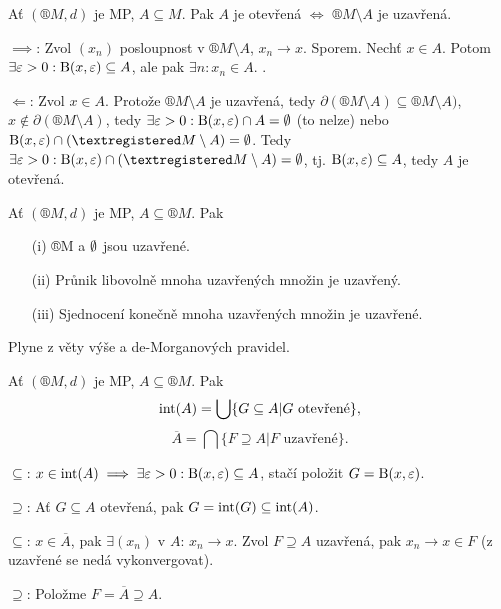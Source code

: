 \documentclass[12pt]{article}					%
\begin{document}
    \begin{veta}
        Ať $(®M, d)$ je MP, $A \subseteq M$. Pak $A$ je otevřená $\Leftrightarrow$ $®M \setminus A$ je uzavřená.

        \begin{dukazin}
            $\implies$: Zvol $(x_n)$ posloupnost v $®M \setminus A$, $x_n \rightarrow x$. Sporem. Nechť $x \in A$. Potom $\exists \varepsilon > 0: \operatorname{B}(x, \varepsilon) \subseteq A$, ale pak $\exists n: x_n \in A$. \lightning.

            $\Leftarrow$: Zvol $x \in A$. Protože $®M \setminus A$ je uzavřená, tedy $\partial(®M \setminus A) \subseteq ®M \setminus A)$, $x \notin \partial(®M \setminus A)$, tedy $\exists \varepsilon > 0: \operatorname{B}(x, \varepsilon) \cap A = \emptyset$ (to nelze) nebo $\B(x, \epsilon)\cap(®M\setminus A) = \O$. Tedy $\exists \epsilon > 0: \B(x, \epsilon) \cap (®M \setminus A) = \O$, tj. $\operatorname{B}(x, \varepsilon) \subseteq A$, tedy $A$ je otevřená.
        \end{dukazin}
    \end{veta}

    \begin{veta}
        Ať $(®M, d)$ je MP, $A \subseteq ®M$. Pak
        
        \begin{itemize}
            \item[(i)] ®M a $\emptyset$ jsou uzavřené.
            \item[(ii)] Průnik libovolně mnoha uzavřených množin je uzavřený.
            \item[(iii)] Sjednocení konečně mnoha uzavřených množin je uzavřené.
        \end{itemize}
        
        \begin{dukazin}
            Plyne z věty výše a de-Morganových pravidel.
        \end{dukazin}
    \end{veta}

    \begin{veta}
        Ať $(®M, d)$ je MP, $A \subseteq ®M$. Pak 
        $$ \operatorname{int}(A) = \bigcup\{G \subseteq A | G \text{ otevřené}\}, $$
        $$ \overline{A} = \bigcap\{F \supseteq A | F \text{ uzavřené}\}. $$

        \begin{dukazin}
            $\subseteq$: $x \in \operatorname{int}(A) \implies \exists \varepsilon > 0: \operatorname{B}(x, \varepsilon) \subseteq A$, stačí položit $G = \operatorname{B}(x, \varepsilon)$.

            $\supseteq$: Ať $G \subseteq A$ otevřená, pak $G = \operatorname{int}(G) \subseteq \operatorname{int}(A)$.

            $\subseteq$: $x \in \overline{A}$, pak $\exists (x_n)$ v $A$: $x_n \rightarrow x$. Zvol $F \supseteq A$ uzavřená, pak $x_n \rightarrow x \in F$ (z uzavřené se nedá vykonvergovat).

            $\supseteq$: Položme $F = \overline{A} \supseteq A$.
        \end{dukazin}
    \end{veta}
\end{document}
